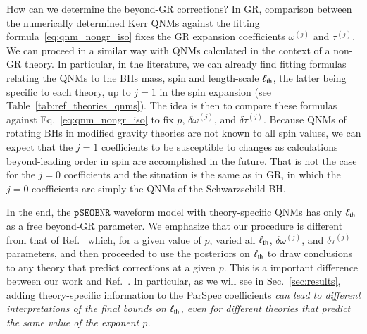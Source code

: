 \documentclass[twocolumn,
               prd,
               aps,
               superscriptaddress,
               tightenlines,
               nofootinbib,
               eqsecnum,
               amsfonts,
               amsmath,
               longbibliography]{revtex4-1}
\newcommand{\pSEOB}{\texttt{pSEOBNR}}
\begin{document}
How can we determine the beyond-GR corrections? In GR, comparison between the numerically determined
Kerr QNMs against the fitting formula~\eqref{eq:qnm_nongr_iso} fixes the GR expansion coefficients
$\omega^{(j)}$ and $\tau^{(j)}$.
%
We can proceed in a similar way with QNMs calculated in the context of a non-GR theory.
%
In particular, in the literature, we can already find fitting formulas relating
the QNMs to the BHs mass, spin and length-scale $\ell_{\rm th}$, the latter being
specific to each theory, up to $j=1$ in the spin expansion (see Table~\ref{tab:ref_theories_qnms}).
%
The idea is then to compare these formulas against Eq.~\eqref{eq:qnm_nongr_iso}
to fix $p$, $\delta\omega^{(j)}$, and $\delta\tau^{(j)}$.
%
Because QNMs of rotating BHs in modified gravity theories are not known to
all spin values, we can expect that the $j=1$ coefficients to be susceptible to
changes as calculations beyond-leading order in spin are accomplished in the future.
%
That is not the case for the $j=0$ coefficients and the situation is the same as in GR,
in which the $j=0$ coefficients are simply the QNMs of the Schwarzschild BH.

In the end, the $\pSEOB$ waveform model with theory-specific
QNMs has only $\ell_{\rm th}$ as a free beyond-GR parameter.
%
We emphasize that our procedure is different from that of
Ref.~\cite{Carullo:2021dui} which, for a given value of $p$, varied all $\ell_{\rm th}$,
$\delta\omega^{(j)}$, and $\delta\tau^{(j)}$ parameters, and then proceeded
to use the posteriors on $\ell_{\rm th}$ to draw conclusions to any theory that predict
corrections at a given $p$.
%
This is a important difference between our work and Ref.~\cite{Carullo:2021dui}.
In particular, as we will see in Sec.~\ref{sec:results}, adding theory-specific
information to the ParSpec coefficients \emph{can lead to different interpretations
of the final bounds on $\ell_{\rm th}$, even for different theories that predict the same
value of the exponent $p$.}
\end{document}
